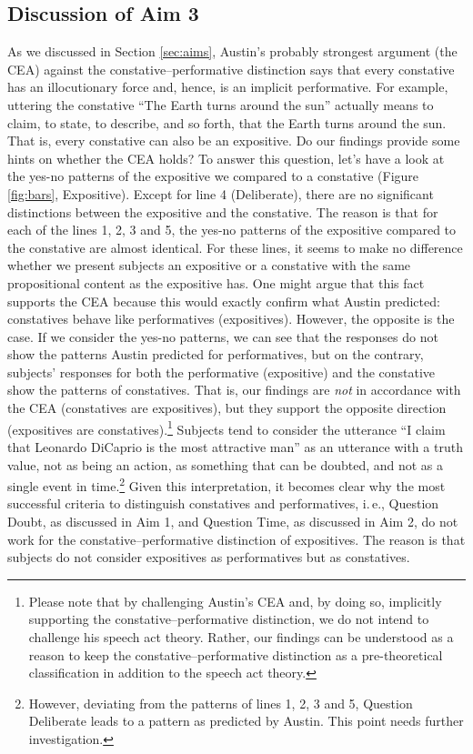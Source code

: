 \documentclass[egregdoesnotlikesansseriftitles,12pt]{scrartcl}
\begin{document}
\subsection{Discussion of Aim 3}
As we discussed in Section \ref{sec:aims}, Austin's probably strongest argument (the CEA) against the constative--performative distinction says that every constative has an illocutionary force and, hence, is an implicit performative. For example, uttering the constative ``The Earth turns around the sun'' actually means to claim, to state, to describe, and so forth, that the Earth turns around the sun. That is, every constative can also be an expositive. Do our findings provide some hints on whether the CEA holds? To answer this question, let's have a look at the yes-no patterns of the expositive we compared to a constative (Figure \ref{fig:bars}, Expositive). Except for line 4 (Deliberate), there are no significant distinctions between the expositive and the constative. The reason is that for each of the lines 1, 2, 3 and 5, the yes-no patterns of the expositive compared to the constative are almost identical. For these lines, it seems to make no difference whether we present subjects an expositive or a constative with the same propositional content as the expositive has. One might argue that this fact supports the CEA because this would exactly confirm what Austin predicted: constatives behave like performatives (expositives). However, the opposite is the case. If we consider the yes-no patterns, we can see that the responses do not show the patterns Austin predicted for performatives, but on the contrary, subjects' responses for both the performative (expositive) and the constative show the patterns of constatives. That is, our findings are \textit{not} in accordance with the CEA (constatives are expositives), but they support the opposite direction (expositives are constatives).\footnote{Please note that by challenging Austin's CEA and, by doing so, implicitly supporting the constative--performative distinction, we do not intend to challenge his speech act theory. Rather, our findings can be understood as a reason to keep the constative--performative distinction as a pre-theoretical classification in addition to the speech act theory.} Subjects tend to consider the utterance ``I claim that Leonardo DiCaprio is the most attractive man'' as an utterance with a truth value, not as being an action, as something that can be doubted, and not as a single event in time.\footnote{However, deviating from the patterns of lines 1, 2, 3 and 5, Question Deliberate leads to a pattern as predicted by Austin. This point needs further investigation.} Given this interpretation, it becomes clear why the most successful criteria to distinguish constatives and performatives, i.\,e., Question Doubt, as discussed in Aim 1, and Question Time, as discussed in Aim 2, do not work for the constative--performative distinction of expositives. The reason is that subjects do not consider expositives as performatives but as constatives.
\end{document}
